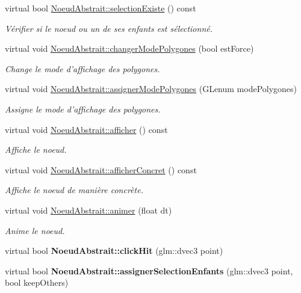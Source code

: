 \begin{DoxyCompactItemize}
virtual bool \hyperlink{group__inf2990_gae7c702b865babd20ddd30dd776adc82b}{Noeud\-Abstrait\-::selection\-Existe} () const 
\begin{DoxyCompactList}\small\item\em Vérifier si le noeud ou un de ses enfants est sélectionné. \end{DoxyCompactList}\item 
virtual void \hyperlink{group__inf2990_ga13a97383c2081b405fc2e0d97cff80df}{Noeud\-Abstrait\-::changer\-Mode\-Polygones} (bool est\-Force)
\begin{DoxyCompactList}\small\item\em Change le mode d'affichage des polygones. \end{DoxyCompactList}\item 
virtual void \hyperlink{group__inf2990_ga726d9d0a524939f405aeeac3fbd06666}{Noeud\-Abstrait\-::assigner\-Mode\-Polygones} (G\-Lenum mode\-Polygones)
\begin{DoxyCompactList}\small\item\em Assigne le mode d'affichage des polygones. \end{DoxyCompactList}\item 
virtual void \hyperlink{group__inf2990_gae789271ea41032d717b8e4300be05de0}{Noeud\-Abstrait\-::afficher} () const 
\begin{DoxyCompactList}\small\item\em Affiche le noeud. \end{DoxyCompactList}\item 
virtual void \hyperlink{group__inf2990_ga330df455c8b08440d3c8e64d0a480391}{Noeud\-Abstrait\-::afficher\-Concret} () const 
\begin{DoxyCompactList}\small\item\em Affiche le noeud de manière concrète. \end{DoxyCompactList}\item 
virtual void \hyperlink{group__inf2990_gadc6ebe69894dbb682fdd0ecb1b6c11e9}{Noeud\-Abstrait\-::animer} (float dt)
\begin{DoxyCompactList}\small\item\em Anime le noeud. \end{DoxyCompactList}\item 
\hypertarget{group__inf2990_gaa43f307d42d6dd8890cdce48c5c53128}{virtual bool {\bfseries Noeud\-Abstrait\-::click\-Hit} (glm\-::dvec3 point)}\label{group__inf2990_gaa43f307d42d6dd8890cdce48c5c53128}

\item 
\hypertarget{group__inf2990_ga4214cc2ab8bb23ab67c10387d7d1ef5e}{virtual bool {\bfseries Noeud\-Abstrait\-::assigner\-Selection\-Enfants} (glm\-::dvec3 point, bool keep\-Others)}\label{group__inf2990_ga4214cc2ab8bb23ab67c10387d7d1ef5e}


\end{DoxyCompactItemize}
